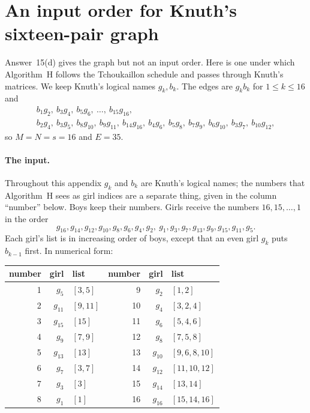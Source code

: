 \section{An input order for Knuth's sixteen-pair graph}
\label{app:knuth16}

Answer~15(d) gives the graph but not an input order. Here is one under
which Algorithm~H follows the Tchoukaillon schedule and passes through
Knuth's matrices. We keep Knuth's logical names $g_k,b_k$. The edges are
$g_kb_k$ for $1\le k\le16$ and
\begin{equation}
\begin{gathered}
 b_1g_2,\ b_3g_4,\ b_5g_6,\ \ldots,\ b_{15}g_{16},\\
 b_2g_4,\ b_3g_5,\ b_8g_{10},\ b_9g_{11},\ b_{14}g_{16},\
 b_4g_6,\ b_5g_8,\ b_7g_9,\ b_6g_{10},\ b_3g_7,\ b_{10}g_{12},
\end{gathered}
\label{eq:knuth16edges}
\end{equation}
so $M=N=s=16$ and $E=35$.

\paragraph{The input.} Throughout this appendix $g_k$ and $b_k$ are Knuth's
logical names; the numbers that Algorithm~H sees as girl indices are a
separate thing, given in the column ``number'' below. Boys keep their
numbers. Girls receive the numbers $16,15,\ldots,1$ in the order
\[
  g_{16},g_{14},g_{12},g_{10},g_8,g_6,g_4,g_2,\ g_1,g_3,g_7,g_{13},g_9,g_{15},g_{11},g_5 .
\]
Each girl's list is in increasing order of boys, except that an even girl
$g_k$ puts $b_{k-1}$ first. In numerical form:
\begin{center}\small
\begin{tabular}{rrl@{\qquad}rrl}
\toprule
number&girl&list&number&girl&list\\
\midrule
1&$g_5$&$[3,5]$&9&$g_2$&$[1,2]$\\
2&$g_{11}$&$[9,11]$&10&$g_4$&$[3,2,4]$\\
3&$g_{15}$&$[15]$&11&$g_6$&$[5,4,6]$\\
4&$g_9$&$[7,9]$&12&$g_8$&$[7,5,8]$\\
5&$g_{13}$&$[13]$&13&$g_{10}$&$[9,6,8,10]$\\
6&$g_7$&$[3,7]$&14&$g_{12}$&$[11,10,12]$\\
7&$g_3$&$[3]$&15&$g_{14}$&$[13,14]$\\
8&$g_1$&$[1]$&16&$g_{16}$&$[15,14,16]$\\
\bottomrule
\end{tabular}
\end{center}

